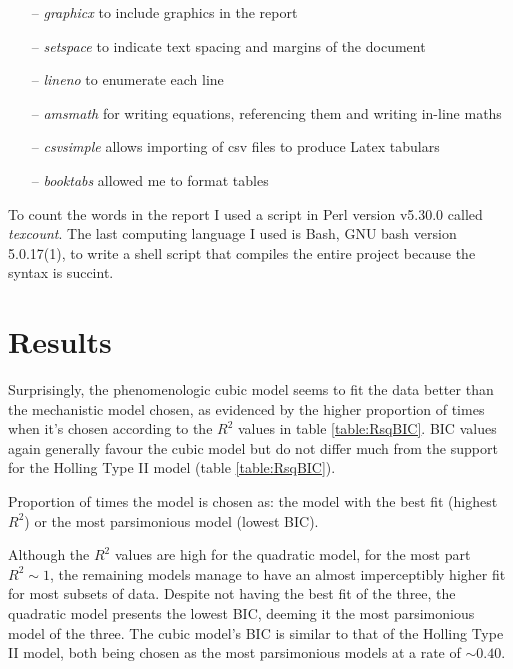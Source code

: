 \documentclass[11pt]{article}
\begin{document}
    \begin{itemize}
      \item[--] \emph{graphicx} to include graphics in the report
      \item[--] \emph{setspace} to indicate text spacing and margins of the document
      \item[--] \emph{lineno} to enumerate each line
      \item[--] \emph{amsmath} for writing equations, referencing them and writing in-line maths
      \item[--] \emph{csvsimple} allows importing of csv files to produce Latex tabulars
      \item[--] \emph{booktabs} allowed me to format tables  
    \end{itemize}

    To count the words in the report I used a script in Perl version v5.30.0 called \emph{texcount}. The last computing language I used is Bash, GNU bash version 5.0.17(1), to write a shell script that compiles the entire project because the syntax is succint.
  
  \section{Results}
  
  Surprisingly, the phenomenologic cubic model seems to fit the data better than the mechanistic model chosen, as evidenced by the higher proportion of times when it's chosen according to the $R^2$ values in table \ref{table:RsqBIC}. BIC values again generally favour the cubic model but do not differ much from the support for the Holling Type II model (table \ref{table:RsqBIC}).

  \begin{table}[h]
    \centering
    \small
    \caption{Proportion of times the model is chosen as: the model with the best fit (highest $R^2$) or the most parsimonious model (lowest BIC).}
    \label{table:RsqBIC}
  \end{table}

  Although the $R^2$ values are high for the quadratic model, for the most part $R^2\sim1$, the remaining models manage to have an almost imperceptibly higher fit for most subsets of data. Despite not having the best fit of the three, the quadratic model presents the lowest BIC, deeming it the most parsimonious model of the three. The cubic model's BIC is similar to that of the Holling Type II model, both being chosen as the most parsimonious models at a rate of $\sim0.40$.
  
\end{document}
